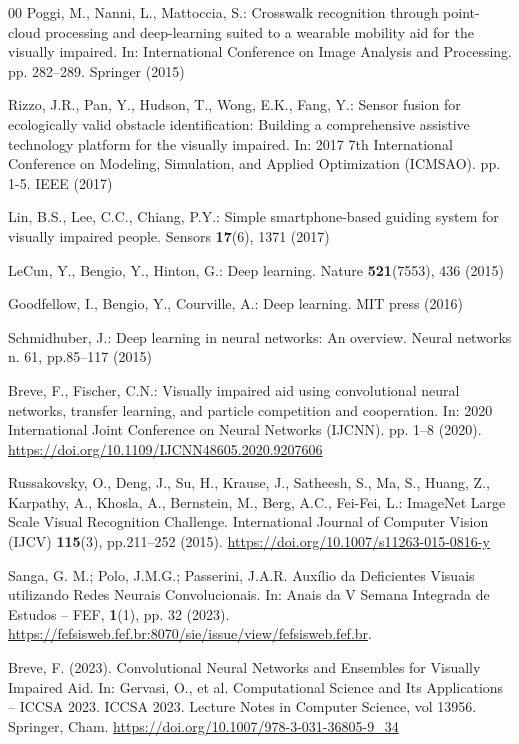 \documentclass[final,5p,times,twocolumn]{elsarticle}
\begin{document}
\begin{thebibliography}{00}
Poggi, M., Nanni, L., Mattoccia, S.: Crosswalk recognition through point-cloud processing and deep-learning suited to a wearable mobility aid for the visually impaired. In: International Conference on Image Analysis and Processing. pp. 282--289. Springer (2015)

Rizzo, J.R., Pan, Y., Hudson, T., Wong, E.K., Fang, Y.: Sensor fusion for ecologically valid obstacle identification: Building a comprehensive assistive technology platform for the visually impaired. In: 2017 7th International Conference on Modeling, Simulation, and Applied Optimization (ICMSAO). pp. 1-5. IEEE (2017)

Lin, B.S., Lee, C.C., Chiang, P.Y.: Simple smartphone-based guiding system for visually impaired people. Sensors \textbf{17}(6), 1371 (2017)

LeCun, Y., Bengio, Y., Hinton, G.: Deep learning. Nature \textbf{521}(7553), 436 (2015)

Goodfellow, I., Bengio, Y., Courville, A.: Deep learning. MIT press (2016)

Schmidhuber, J.: Deep learning in neural networks: An overview. Neural networks n. 61, pp.85--117 (2015)

Breve, F., Fischer, C.N.: Visually impaired aid using convolutional neural networks, transfer learning, and particle competition and cooperation. In: 2020 International Joint Conference on Neural Networks (IJCNN). pp. 1--8 (2020). \url{https://doi.org/10.1109/IJCNN48605.2020.9207606}

Russakovsky, O., Deng, J., Su, H., Krause, J., Satheesh, S., Ma, S., Huang, Z., Karpathy, A., Khosla, A., Bernstein, M., Berg, A.C., Fei-Fei, L.: ImageNet Large Scale Visual Recognition Challenge. International Journal of Computer Vision (IJCV) \textbf{115}(3), pp.211--252 (2015). \url{https://doi.org/10.1007/s11263-015-0816-y}

Sanga, G. M.; Polo, J.M.G.; Passerini, J.A.R. Auxílio da Deficientes Visuais utilizando Redes Neurais Convolucionais. In: Anais da V Semana Integrada de Estudos – FEF, \textbf{1}(1), pp. 32 (2023). \url{https://fefsisweb.fef.br:8070/sie/issue/view/fefsisweb.fef.br}.

Breve, F. (2023). Convolutional Neural Networks and Ensembles for Visually Impaired Aid. In: Gervasi, O., et al. Computational Science and Its Applications – ICCSA 2023. ICCSA 2023. Lecture Notes in Computer Science, vol 13956. Springer, Cham. \url{https://doi.org/10.1007/978-3-031-36805-9\_34}


\end{thebibliography}
\end{document}
